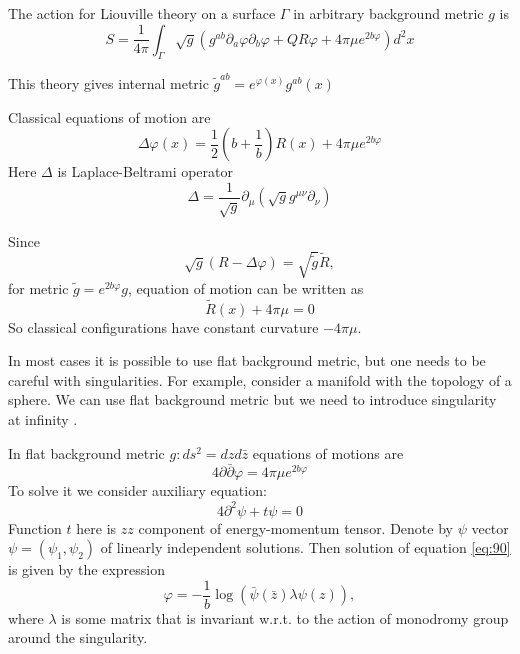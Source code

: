 \documentclass[12pt]{article}
\begin{document}
The action for Liouville theory on a surface $\Gamma$ in arbitrary background metric $g$ is
\begin{equation}
  \label{eq:13}
  S=\frac{1}{4\pi} \int_{\Gamma} \sqrt{g} \left( g^{ab} \partial_{a}\varphi \partial_{b}\varphi + Q R \varphi +4\pi \mu e^{2b\varphi}\right) d^{2}x
\end{equation}

This theory gives internal metric $\tilde g^{ab}=e^{\varphi(x)}g^{ab}(x)$


Classical equations of motion are
\begin{equation}
  \label{eq:16}
  \Delta \varphi(x) = \frac{1}{2} \left(b+\frac{1}{b}\right) R (x) + 4\pi \mu e^{2 b \varphi}
\end{equation}
Here $\Delta$ is Laplace-Beltrami operator
\begin{equation}
  \label{eq:17}
  \Delta=\frac{1}{\sqrt{g}}\partial_{\mu} \left(\sqrt{g} g^{\mu\nu} \partial_{\nu}\right)
\end{equation}

Since
\begin{equation}
  \label{eq:93}
  \sqrt{g}(R-\Delta \varphi)=\sqrt{\tilde g} \tilde R, 
\end{equation}
for metric $\tilde g= e^{2b\varphi} g$, equation of motion can be written as
\begin{equation}
  \label{eq:94}
  \tilde R(x) + 4\pi \mu=0
\end{equation}
So classical configurations have constant curvature $-4\pi\mu$.

In most cases it is possible to use flat background metric, but one needs to be careful with
singularities. For example, consider a manifold with the topology of a sphere. We can use flat
background metric but we need to introduce singularity at infinity \cite{zamolodchikovlectures}. 

In flat background metric $g: ds^{2}=dz d\bar z$ equations of motions are
\begin{equation}
  \label{eq:90}
  4\partial\bar \partial \varphi = 4\pi\mu e^{2b\varphi}
\end{equation}
To solve it we consider auxiliary equation:
\begin{equation}
  \label{eq:91}
  4\partial^{2} \psi + t\psi=0
\end{equation}
Function $t$ here is $zz$ component of energy-momentum tensor. Denote by $\psi$  vector
$\psi=(\psi_{1},\psi_{2})$ of linearly independent solutions. Then solution of equation
\eqref{eq:90} is given by the expression
\begin{equation}
  \label{eq:92}
  \varphi=-\frac{1}{b} \log \left(\bar \psi(\bar z) \lambda \psi(z)\right),
\end{equation}
where $\lambda$ is some matrix that is invariant w.r.t. to the action of monodromy group around the
singularity. 
\end{document}
